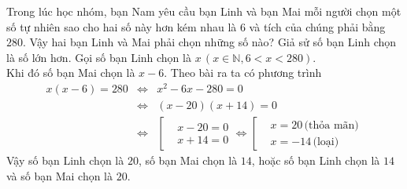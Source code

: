 \begin{ex}%
	Trong lúc học nhóm, bạn Nam yêu cầu bạn Linh và bạn Mai mỗi người chọn một số tự nhiên sao cho hai số này hơn kém nhau là $6$ và tích của chúng phải bằng $280$. Vậy hai bạn Linh và Mai phải chọn những số nào?
	\loigiai
	{ Giả sử số bạn Linh chọn là số lớn hơn. Gọi số bạn Linh chọn là $x\, \left(x\in \mathbb{N} , 6<x<280\right).$\\
		Khi đó số bạn Mai chọn là $x-6.$ Theo bài ra ta có phương trình 
		\begin{eqnarray*}
		x(x-6)=280 &\Leftrightarrow & x^2-6x-280=0 \\
		& \Leftrightarrow & (x-20)(x+14)=0\\
		& \Leftrightarrow & \left [\begin {aligned}&x-20=0\\&x+14=0 \end{aligned}\right. \Leftrightarrow \left [\begin{aligned}
		&x=20 \, \text{(thỏa mãn)}\\&x=-14 \,\text{(loại)} \end{aligned}\right.
		\end{eqnarray*}
	Vậy số bạn Linh chọn là $20$, số bạn Mai chọn là $14$, hoặc số bạn Linh chọn là $14$ và số bạn Mai chọn là $20$.
	}
\end{ex}

